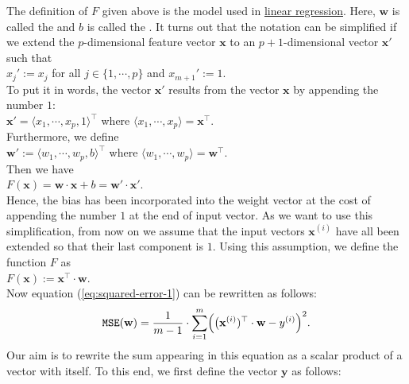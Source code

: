 \documentclass[12pt]{article}
\begin{document}
The definition of $F$ given above is the model used in
\href{https://en.wikipedia.org/wiki/Linear_regression}{linear regression}. 
Here, $\mathbf{w}$ is called the {\color{blue}{weight vector}} and $b$ is called the {\color{blue}{bias}}.  It turns out that the notation can be simplified if we extend the $p$-dimensional feature vector $\mathbf{x}$ to an
$p+1$-dimensional vector $\mathbf{x}'$ such that
\\[0.2cm]
\hspace*{1.3cm}
$x_j' := x_j$ \quad for all $j\in\{1,\cdots,p\}$ \quad and \quad $x_{m+1}' := 1$.
\\[0.2cm]
To put it in words, the vector $\mathbf{x}'$ results from the vector $\mathbf{x}$ by appending the number $1$:
\\[0.2cm]
\hspace*{1.3cm}
$\mathbf{x}' = \langle x_1, \cdots, x_p, 1 \rangle^\top$ \quad where $\langle x_1, \cdots, x_p \rangle = \mathbf{x}^\top$.
\\[0.2cm]
Furthermore, we define 
\\[0.2cm]
\hspace*{1.3cm}
$\mathbf{w}' := \langle w_1, \cdots, w_p, b \rangle^\top$ \quad where $\langle w_1, \cdots, w_p \rangle = \mathbf{w}^\top$.
\\[0.2cm]
Then we have
\\[0.2cm]
\hspace*{1.3cm}
$ F(\mathbf{x}) = \mathbf{w} \cdot \mathbf{x} + b = \mathbf{w}' \cdot \mathbf{x}'$.
\\[0.2cm]
Hence, the bias has been incorporated into the weight vector at the cost of appending the number $1$ at the end of
input vector.  As we want to use this simplification, from now on we assume that the input vectors
$\mathbf{x}^{(i)}$ have all been extended so that their last component is $1$.  Using this
assumption,  we define the
function $F$ as
\\[0.2cm]
\hspace*{1.3cm}
$F(\mathbf{x}) := \mathbf{x}^\top \cdot \mathbf{w}$.
\\[0.2cm]
Now equation (\ref{eq:squared-error-1}) can be rewritten as follows:
\begin{equation}
  \label{eq:squared-error-2}
  \mathtt{MSE}(\mathbf{w}) = \frac{1}{m-1} \cdot \sum\limits_{i=1}^m \Bigl(\bigl(\mathbf{x}^{(i)})^\top \cdot \mathbf{w}  - y^{(i)}\Bigr)^2.
\end{equation}
Our aim is to rewrite the sum appearing in this equation as a scalar product of a vector with
itself.  To this end, we first define the vector $\mathbf{y}$ as follows:
\end{document}
